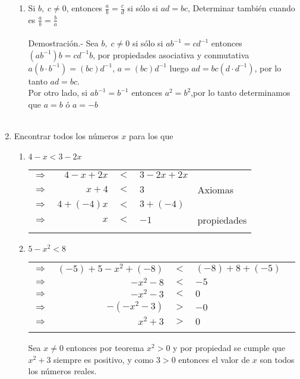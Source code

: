 \begin{enumerate}[\bfseries 1.]
\begin{enumerate}[\bfseries i)]
\item Si $b,\; c \neq 0$, entonces $\displaystyle\frac{a}{b}=\frac{c}{d}$ si sólo si $ad=bc$, Determinar también cuando es $\displaystyle\frac{a}{b}=\frac{b}{a}$\\\\
Demostración.- \; Sea $b,\; c \neq 0$ si sólo si $ab^{-1}=cd^{-1}$ entonces $(ab^{-1})b=cd^{-1}b$, por propiedades asociativa y conmutativa $a(b\cdot b^{-1})=(bc)d^{-1}$, $a=(bc)d^{-1}$ luego $ad=bc(d\cdot d^{-1})$, por lo tanto $ad=bc$.\\
Por otro lado, si $ab^{-1} = b^{-1}$ entonces  $a^2=b^2$,por lo tanto determinamos que $a=b$ ó $a=-b$ \\\\
\end{enumerate}

\item Encontrar todos los números $x$ para los que
\begin{enumerate}[\bfseries i)]
\item $4-x<3-2x$
\begin{center}
\begin{tabular}{c r c l l}
$\Rightarrow$&$4-x+2x$&$<$&$3-2x+2x$&\\
$\Rightarrow$&$x+4$&$<$&$3$&Axiomas\\
$\Rightarrow$&$4+(-4)x$&$<$&$3+(-4)$&\\
$\Rightarrow$&$x$&$<$&$-1$&propiedades\\\\
\end{tabular}
\end{center}

\item $5-x^2<8$
\begin{center}
\begin{tabular}{crcll}
$\Rightarrow$&$(-5)+5-x^2+(-8)$&$<$&$(-8)+8+(-5)$&\\
$\Rightarrow$&$-x^2-8$&$<$&$-5$&\\
$\Rightarrow$&$-x^2-3$&$<$&$0$&\\
$\Rightarrow$&$-(-x^2-3)$&$>$&$-0$&\\
$\Rightarrow$&$x^2+3$&$>$&$0$&\\\\
\end{tabular}
\end{center}
Sea $x \neq 0$ entonces por teorema \; $x^2>0$ y por propiedad se cumple que $x^2+3$ siempre es positivo, y como $3>0$ entonces el valor de $x$ son todos los números reales.\\\\


\end{enumerate}
\end{enumerate}
